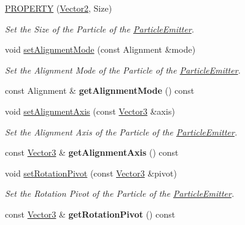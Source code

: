 \begin{DoxyCompactItemize}
\hyperlink{class_magnum_1_1_bill_board_a44595e898aed542ccf25a45d82b2869c}{P\+R\+O\+P\+E\+R\+TY} (\hyperlink{class_magnum_1_1_vector2}{Vector2}, Size)
\begin{DoxyCompactList}\small\item\em Set the Size of the Particle of the \hyperlink{class_magnum_1_1_particle_emitter}{Particle\+Emitter}. \end{DoxyCompactList}\item 
void \hyperlink{class_magnum_1_1_bill_board_af5898fa7b3af0a3b2c919d93c83a6c43}{set\+Alignment\+Mode} (const Alignment \&mode)
\begin{DoxyCompactList}\small\item\em Set the Alignment Mode of the Particle of the \hyperlink{class_magnum_1_1_particle_emitter}{Particle\+Emitter}. \end{DoxyCompactList}\item 
const Alignment \& {\bfseries get\+Alignment\+Mode} () const \hypertarget{class_magnum_1_1_bill_board_a7449d9a0d23e0c584e4d2a73afd233a8}{}\label{class_magnum_1_1_bill_board_a7449d9a0d23e0c584e4d2a73afd233a8}

\item 
void \hyperlink{class_magnum_1_1_bill_board_afebe7edeb5174befb91e9f9205678c89}{set\+Alignment\+Axis} (const \hyperlink{class_magnum_1_1_vector3}{Vector3} \&axis)
\begin{DoxyCompactList}\small\item\em Set the Alignment Axis of the Particle of the \hyperlink{class_magnum_1_1_particle_emitter}{Particle\+Emitter}. \end{DoxyCompactList}\item 
const \hyperlink{class_magnum_1_1_vector3}{Vector3} \& {\bfseries get\+Alignment\+Axis} () const \hypertarget{class_magnum_1_1_bill_board_ade8cdb1b707c9c408da541d9693802e1}{}\label{class_magnum_1_1_bill_board_ade8cdb1b707c9c408da541d9693802e1}

\item 
void \hyperlink{class_magnum_1_1_bill_board_adf4d1c65adcbf8b3ad6767aaa0b18fb5}{set\+Rotation\+Pivot} (const \hyperlink{class_magnum_1_1_vector3}{Vector3} \&pivot)
\begin{DoxyCompactList}\small\item\em Set the Rotation Pivot of the Particle of the \hyperlink{class_magnum_1_1_particle_emitter}{Particle\+Emitter}. \end{DoxyCompactList}\item 
const \hyperlink{class_magnum_1_1_vector3}{Vector3} \& {\bfseries get\+Rotation\+Pivot} () const \hypertarget{class_magnum_1_1_bill_board_a35d961b382d6c9199a6c2fb0f853fd40}{}\label{class_magnum_1_1_bill_board_a35d961b382d6c9199a6c2fb0f853fd40}

\end{DoxyCompactItemize}

